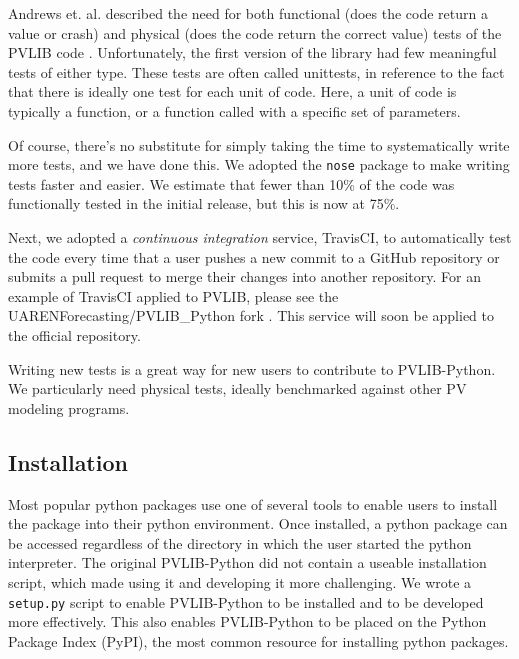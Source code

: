 \documentclass[conference]{IEEEtran}
\begin{document}
Andrews et. al. described the need for both functional (does the code return a value or crash) and physical (does the code return the correct value) tests of the PVLIB code \cite{andrews}.
Unfortunately, the first version of the library had few meaningful tests of either type.
These tests are often called unittests, in reference to the fact that there is ideally one test for each unit of code.
Here, a unit of code is typically a function, or a function called with a specific set of parameters.

Of course, there's no substitute for simply taking the time to systematically write more tests, and we have done this.
We adopted the \texttt{nose} package \cite{nosetests} to make writing tests faster and easier.
We estimate that fewer than 10\% of the code was functionally tested in the initial release, but this is now at 75\%.

Next, we adopted a \emph{continuous integration} service, TravisCI, to automatically test the code every time that a user pushes a new commit to a GitHub repository or submits a pull request to merge their changes into another repository. 
For an example of TravisCI applied to PVLIB, please see the UARENForecasting/PVLIB{\_}Python fork \cite{uaren-pvlib}.
This service will soon be applied to the official repository.

Writing new tests is a great way for new users to contribute to PVLIB-Python. We particularly need physical tests, ideally benchmarked against other PV modeling programs.


\subsection{Installation}

Most popular python packages use one of several tools to enable users to install the package into their python environment.
Once installed, a python package can be accessed regardless of the directory in which the user started the python interpreter.
The original PVLIB-Python did not contain a useable installation script, which made using it and developing it more challenging.
We wrote a \texttt{setup.py} script to enable PVLIB-Python to be installed and to be developed more effectively.
This also enables PVLIB-Python to be placed on the Python Package Index (PyPI), the most common resource for installing python packages.


\end{document}
